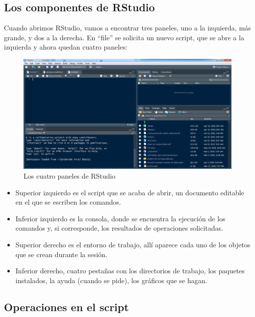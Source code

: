 \documentclass[]{book}
\begin{document}
\hypertarget{los-componentes-de-rstudio}{%
\subsection{Los componentes de RStudio}\label{los-componentes-de-rstudio}}

Cuando abrimos RStudio, vamos a encontrar tres paneles, uno a la izquierda, más grande, y dos a la derecha. En ``file'' se solicita un nuevo script, que se abre a la izquierda y ahora quedan cuatro paneles:

\begin{figure}
\centering
\includegraphics{imagenes/entornoRStudio.png}
\caption{Los cuatro paneles de RStudio}
\end{figure}

\begin{itemize}
\item
  Superior izquierdo es el script que se acaba de abrir, un documento editable en el que se escriben los comandos.
\item
  Inferior izquierdo es la consola, donde se encuentra la ejecución de los comandos y, si corresponde, los resultados de operaciones solicitadas.
\item
  Superior derecho es el entorno de trabajo, allí aparece cada uno de los objetos que se crean durante la sesión.
\item
  Inferior derecho, cuatro pestañas con los directorios de trabajo, los paquetes instalados, la ayuda (cuando se pide), los gráficos que se hagan.
\end{itemize}

\hypertarget{operaciones-en-el-script}{%
\subsection{Operaciones en el script}\label{operaciones-en-el-script}}
\end{document}
